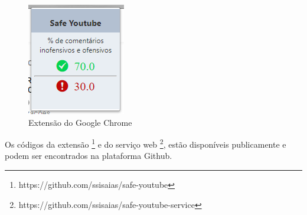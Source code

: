 \begin{figure}[H] %
	\caption{\label{fig:chrome_plugin} Extensão do Google Chrome}
	\begin{center}
	    \includegraphics[scale=1.2]{figuras/extensao_chrome.PNG} %
	\end{center}
\end{figure}

Os códigos da extensão \footnote{https://github.com/ssisaias/safe-youtube} e do serviço web \footnote{https://github.com/ssisaias/safe-youtube-service}, estão disponíveis publicamente e podem ser encontrados na plataforma Github.

